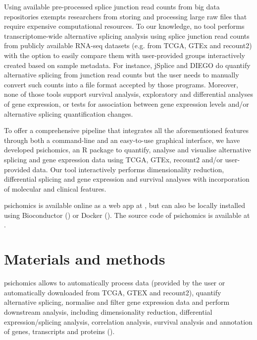 Using available pre-processed splice junction read counts from big data repositories exempts researchers from storing and processing large raw files that require expensive computational resources. To our knowledge, no tool performs transcriptome-wide alternative splicing analysis using splice junction read counts from publicly available RNA-seq datasets (e.g. from TCGA, GTEx and recount2) with the option to easily compare them with user-provided groups interactively created based on sample metadata. For instance, jSplice \cite{christinat:2016ui} and DIEGO \cite{doose:2018uv} do quantify alternative splicing from junction read counts but the user needs to manually convert such counts into a file format accepted by those programs. Moreover, none of those tools support survival analysis, exploratory and differential analyses of gene expression, or tests for association between gene expression levels and/or alternative splicing quantification changes.

To offer a comprehensive pipeline that integrates all the aforementioned features through both a command-line and an easy-to-use graphical interface, we have developed psichomics, an R package to quantify, analyse and visualise alternative splicing and gene expression data using TCGA, GTEx, recount2 and/or user-provided data. Our tool interactively performs dimensionality reduction, differential splicing and gene expression and survival analyses with incorporation of molecular and clinical features.


psichomics is available online as a web app at , but can also be locally installed using Bioconductor () or Docker (). The source code of psichomics is available at .

\section{Materials and methods}

psichomics allows to automatically process data (provided by the user or automatically downloaded from TCGA, GTEX and recount2), quantify alternative splicing, normalise and filter gene expression data and perform downstream analysis, including dimensionality reduction, differential expression/splicing analysis, correlation analysis, survival analysis and annotation of genes, transcripts and proteins ().

